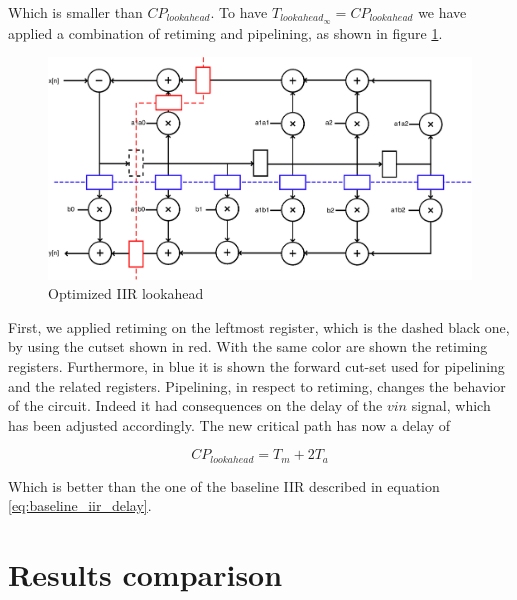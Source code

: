 Which is smaller than $CP_{lookahead}$. To have $T_{lookahead_{\infty}} = CP_{lookahead}$ we have applied a combination of retiming and pipelining, as
shown in figure \ref{fig:lookahead_opt}.

\begin{figure}[!ht]
	\centering
	\includegraphics[width=0.8\linewidth]{./chapters/pictures/iir_opt.pdf}
	\caption{Optimized IIR lookahead}
	\label{fig:lookahead_opt}
\end{figure}

First, we applied retiming on the leftmost register, which is the dashed black one, by using the cutset shown in red. With the same color are shown the
retiming registers. Furthermore, in blue it is shown the forward cut-set used for pipelining and the related registers.
Pipelining, in respect to retiming, changes the behavior of the circuit. Indeed it had consequences on the delay of the $vin$ signal, which has been
adjusted accordingly. The new critical path has now a delay of

\begin{equation}
    CP_{lookahead} = T_{m} + 2T_{a}
\end{equation}

Which is better than the one of the baseline IIR described in equation \ref{eq:baseline_iir_delay}.
\section{Results comparison}